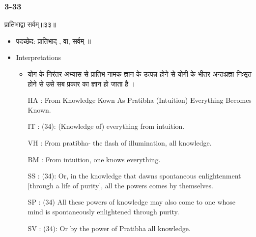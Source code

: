 \begin{frame}[fragile]\frametitle{3-33}
\begin{sanskrit}
प्रातिभाद्वा सर्वम्॥३३॥
\end{sanskrit}

	\begin{itemize}
	\item पदच्छेद:  ‌प्रातिभाद् , वा, सर्वम् ॥
	\item Interpretations
		\begin{itemize}	
		\item योग के निरंतर अभ्यास से प्रातिभ नामक ज्ञान के उत्पन्न होने से योगी के भीतर अन्तःप्रज्ञा निःसृत होने से उसे सब प्रकार का ज्ञान हो जाता है ।
		\item [HA]: From Knowledge Kown As Pratibha (Intuition) Everything Becomes Known.
		\item [IT]: (34): (Knowledge of) everything from intuition.
		\item [VH]: From pratibha- the flash of illumination, all knowledge.
		\item [BM]: From intuition, one knows everything.
		\item [SS]: (34): Or, in the knowledge that dawns spontaneous enlightenment [through a life of purity], all the powers comes by themselves.
		\item [SP]: (34) All these powers of knowledge may also come to one whose mind is spontaneously enlightened through purity.
		\item [SV]: (34): Or by the power of Pratibha all knowledge. 
		\end{itemize}
	\end{itemize}
\end{frame}

